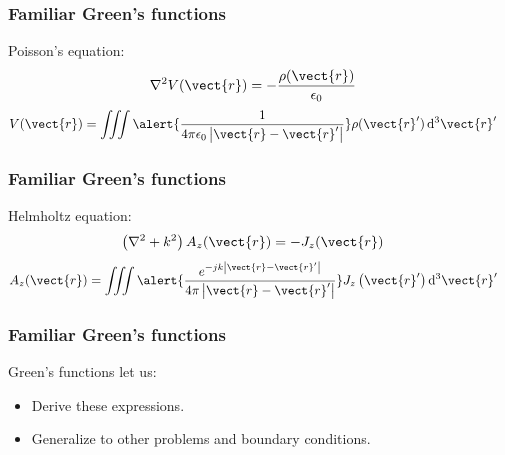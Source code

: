 \documentclass[12 pt, compress, handout, intlimits]{beamer}
\renewcommand{\d}{\operatorname{d}\!}
\begin{document}
\begin{frame}[fragile]
    \frametitle{Familiar Green's functions}

    Poisson's equation:
    \begin{align*}
        \nabla^2 V(\vect{r}) &= - \frac{\rho(\vect{r})}{\epsilon_0}
    \end{align*}
    \begin{align*}
        V(\vect{r}) &= \iiint \alert{\frac{1}{4 \pi \epsilon_0 \left| \vect{r} - \vect{r}' \right|}} \rho(\vect{r}') \d^3 \vect{r}'
    \end{align*}
\end{frame}


\begin{frame}[fragile]
    \frametitle{Familiar Green's functions}
    
    Helmholtz equation:
    \begin{align*}
        \left( \nabla^2 + k^2 \right) A_z(\vect{r}) &= -J_z(\vect{r})
    \end{align*}
    \begin{align*}
        A_z(\vect{r}) &= \iiint \alert{\frac{e^{-jk \left| \vect{r} - \vect{r}' \right|}}{4 \pi \left| \vect{r} - \vect{r}' \right|}} J_z\left( \vect{r}' \right) \d^3 \vect{r}'
    \end{align*}
\end{frame}


\begin{frame}[fragile]
    \frametitle{Familiar Green's functions}
    
    Green's functions let us:
    \begin{itemize}
    \item
        Derive these expressions.
    \item
        Generalize to other problems and boundary conditions.
    \end{itemize}
    
\end{frame}
\end{document}
